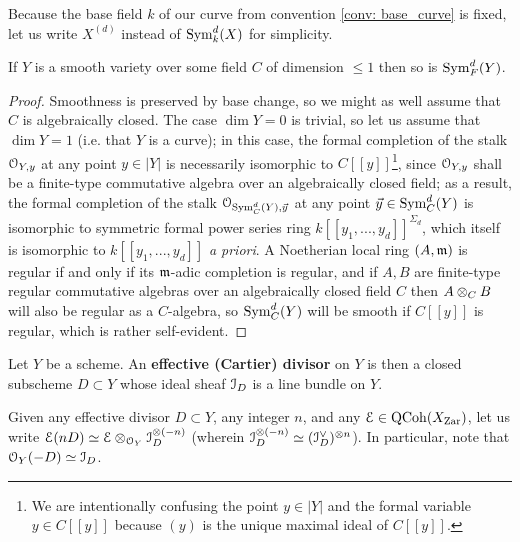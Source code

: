         \begin{convention}
            Because the base field $k$ of our curve from convention \ref{conv: base_curve} is fixed, let us write $X^{(d)}$ instead of $\mathrm{Sym}^d_k(X)$ for simplicity.
        \end{convention}
        \begin{proposition} \label{prop: smoothness_of_symmetric_powers}
            If $Y$ is a smooth variety over some field $C$ of dimension $\leq 1$ then so is $\mathrm{Sym}_F^d(Y)$.
        \end{proposition}
            \begin{proof}
                Smoothness is preserved by base change, so we might as well assume that $C$ is algebraically closed. The case $\dim Y = 0$ is trivial, so let us assume that $\dim Y = 1$ (i.e. that $Y$ is a curve); in this case, the formal completion of the stalk $\mathcal{O}_{Y, y}$ at any point $y \in |Y|$ is necessarily isomorphic to $C[\![y]\!]$\footnote{We are intentionally confusing the point $y \in |Y|$ and the formal variable $y \in C[\![y]\!]$ because $(y)$ is the unique maximal ideal of $C[\![y]\!]$.}, since $\mathcal{O}_{Y, y}$ shall be a finite-type commutative algebra over an algebraically closed field; as a result, the formal completion of the stalk $\mathcal{O}_{\mathrm{Sym}^d_C(Y), \vec{y}}$ at any point $\vec{y} \in \mathrm{Sym}^d_C(Y)$ is isomorphic to symmetric formal power series ring $k[\![y_1, ..., y_d]\!]^{\Sigma_d}$, which itself is isomorphic to $k[\![y_1, ..., y_d]\!]$ \textit{a priori}. A Noetherian local ring $(A, \mathfrak{m})$ is regular if and only if its $\mathfrak{m}$-adic completion is regular, and if $A, B$ are finite-type regular commutative algebras over an algebraically closed field $C$ then $A \tensor_C B$ will also be regular as a $C$-algebra, so $\mathrm{Sym}_C^d(Y)$ will be smooth if $C[\![y]\!]$ is regular, which is rather self-evident.
            \end{proof}
        
        \begin{definition}[Divisors] \label{def: divisors}
            Let $Y$ be a scheme. An \textbf{effective (Cartier) divisor} on $Y$ is then a closed subscheme $D \subset Y$ whose ideal sheaf $\mathcal{I}_D$ is a line bundle on $Y$.
        \end{definition}
        \begin{convention}
            Given any effective divisor $D \subset Y$, any integer $n$, and any $\mathcal{E} \in \mathrm{QCoh}(X_{\mathrm{Zar}})$, let us write $\E(nD) \cong \E \tensor_{\calO_Y} \calI_D^{\tensor (-n)}$ (wherein $\calI_D^{\tensor (-n)} \cong (\calI_D^{\vee})^{\tensor n}$). In particular, note that $\mathcal{O}_Y(-D) \simeq \mathcal{I}_D$.
        \end{convention}
        \begin{definition} \label{def: the_abel_jacobi_map}
            
        \end{definition}
        
